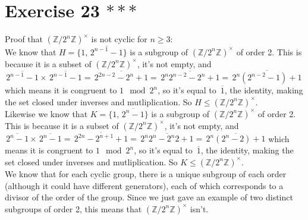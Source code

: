 \documentclass{article}
\newcommand{\Z}{\mathbb{Z}}
\newcommand{\olsi}[1]{\,\overline{\!{#1}}}
\begin{document}
    \section*{Exercise 23 $***$}
    Proof that $(\Z/2^n\Z)^\times$ is not cyclic for $n \geqslant 3$: \\
    We know that $H = \{1, \olsi{2^{n-1} - 1}\}$
    is a subgroup of $(\Z/2^n\Z)^\times$ of order 2.
    This is because it is a subset of $(\Z/2^n\Z)^\times$,
    it's not empty, 
    and $\olsi{2^{n-1} - 1} \times \olsi{2^{n-1} - 1}
    = \olsi{2^{2n-2} - 2^n + 1} = \olsi{2^n2^{n-2} - 2^n + 1}
    =  \olsi{2^n(2^{n-2} - 1) + 1}$
    which means it is congruent to  $1 \mod 2^n$,
    so it's equal to $\olsi{1}$, the identity,
    making the set closed under inverses and mutliplication.
    So $H \leqslant (\Z/2^n\Z)^\times$. \\
    Likewise we know that $K = \{1, \olsi{2^n - 1}\}$
    is a subgroup of $(\Z/2^n\Z)^\times$ of order 2.
    This is because it is a subset of $(\Z/2^n\Z)^\times$,
    it's not empty, 
    and $\olsi{2^n - 1} \times \olsi{2^n - 1}
    = \olsi{2^{2n} - 2^{n+1} + 1} = \olsi{2^n2^n - 2^n2 + 1}
    =  \olsi{2^n(2^n - 2) + 1}$
    which means it is congruent to  $1 \mod 2^n$,
    so it's equal to $\olsi{1}$, the identity,
    making the set closed under inverses and mutliplication.
    So $K \leqslant (\Z/2^n\Z)^\times$. \\
    We know that for each cyclic group,
    there is a unique subgroup of each order
    (although it could have different generators),
    each of which corresponds to a divisor of the order of the group.
    Since we just gave an example of two distinct
    subgroups of order 2,
    this means that $(\Z/2^n\Z)^\times$ isn't.
\end{document}
